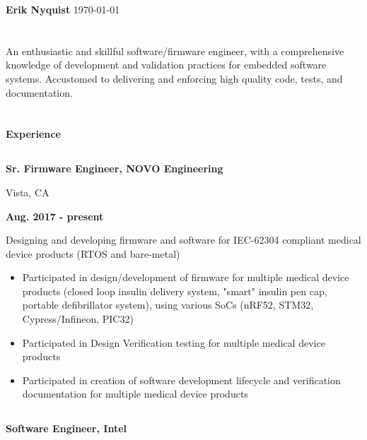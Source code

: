 \documentclass[6pt]{article}
\begin{document}
\begin{minipage}{38em}
\bigskip{}
\bigskip{}
\bigskip{}
%
%
{\Huge \bfseries Erik Nyquist}
{\hfill \today}
\section*{}
\begin{flushleft}
An enthusiastic and skillful software/firmware engineer, with a comprehensive knowledge of
development and validation practices for embedded software systems. Accustomed to
delivering and enforcing high quality code, tests, and documentation.
\end{flushleft}
\section*{}
{\Large \bfseries Experience}

\dotfill
%
%
\subsection*{}
\begin{minipage}{22em}
{\bfseries Sr. Firmware Engineer, NOVO Engineering

Vista, CA}
\end{minipage}
\hfill
\begin{minipage}{10em}
{\bfseries Aug. 2017 - present}
\end{minipage}
\begin{flushleft}
Designing and developing firmware and software for IEC-62304 compliant medical
device products (RTOS and bare-metal)
\begin{itemize}
    \item Participated in design/development of firmware for multiple medical
          device products (closed loop insulin delivery system, "smart" insulin pen
          cap, portable defibrillator system), using various SoCs (nRF52, STM32,
          Cypress/Infineon, PIC32)
    \item Participated in Design Verification testing for multiple medical device products
    \item Participated in creation of software development lifecycle and
          verification documentation for multiple medical device products
\end{itemize}
\end{flushleft}
\dotfill
%
%
\subsection*{}
\begin{minipage}{20em}
{\bfseries Software Engineer, Intel

}
\end{minipage}
\end{minipage}
\end{document}
